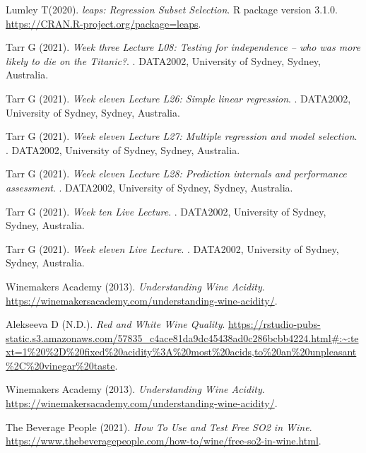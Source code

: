 \documentclass[letterpaper,8pt,twocolumn,twoside,]{pinp}
\begin{document}
\begin{thebibliography}{3}
\bibitem[{Lumley T(2020)}]{}
Lumley T(2020).
\newblock \emph{leaps: Regression Subset Selection}.
\newblock  R package version 3.1.0. \urlprefix\url{https://CRAN.R-project.org/package=leaps}.

\bibitem[{Tarr G (2021)}]{}
Tarr G (2021).
\newblock \emph{Week three Lecture L08: Testing for independence – who was more likely to die on the Titanic?}.
. DATA2002, University of Sydney, Sydney, Australia.

\bibitem[{Tarr G (2021)}]{}
Tarr G (2021).
\newblock \emph{Week eleven Lecture L26: Simple linear regression}.
. DATA2002, University of Sydney, Sydney, Australia.

\bibitem[{Tarr G (2021)}]{}
Tarr G (2021).
\newblock \emph{Week eleven Lecture L27: Multiple regression and model selection}.
. DATA2002, University of Sydney, Sydney, Australia.

\bibitem[{Tarr G (2021)}]{}
Tarr G (2021).
\newblock \emph{Week eleven Lecture L28: Prediction internals and performance assessment}.
. DATA2002, University of Sydney, Sydney, Australia.

\bibitem[{Tarr G (2021)}]{}
Tarr G (2021).
\newblock \emph{Week ten Live Lecture}.
. DATA2002, University of Sydney, Sydney, Australia.

\bibitem[{Tarr G (2021)}]{}
Tarr G (2021).
\newblock \emph{Week eleven Live Lecture}.
. DATA2002, University of Sydney, Sydney, Australia.

Winemakers Academy (2013).
\newblock \emph{Understanding Wine Acidity}.
\newblock \urlprefix\url{https://winemakersacademy.com/understanding-wine-acidity/}.

\bibitem[{Alekseeva D (N.D.)}]{}
Alekseeva D (N.D.).
\newblock \emph{Red and White Wine Quality}.
\newblock \urlprefix\url{https://rstudio-pubs-static.s3.amazonaws.com/57835_c4ace81da9dc45438ad0c286bcbb4224.html#:~:text=1%20%2D%20fixed%20acidity%3A%20most%20acids,to%20an%20unpleasant%2C%20vinegar%20taste}.

Winemakers Academy (2013).
\newblock \emph{Understanding Wine Acidity}.
\newblock \urlprefix\url{https://winemakersacademy.com/understanding-wine-acidity/}.

The Beverage People (2021).
\newblock \emph{How To Use and Test Free SO2 in Wine}.
\newblock \urlprefix\url{https://www.thebeveragepeople.com/how-to/wine/free-so2-in-wine.html}.


\end{thebibliography}
\end{document}
